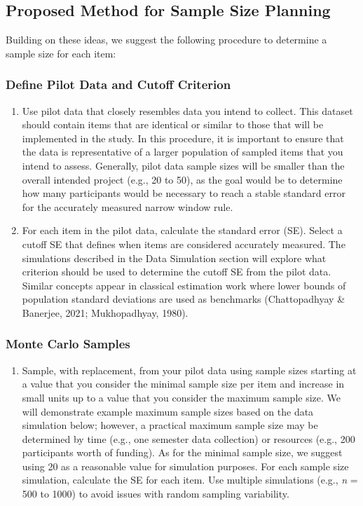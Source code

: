 \documentclass[
  man]{apa7}
\providecommand{\tightlist}{%
  \setlength{\itemsep}{0pt}\setlength{\parskip}{0pt}}
\begin{document}
\subsection{Proposed Method for Sample Size Planning}\label{proposed-method-for-sample-size-planning}

Building on these ideas, we suggest the following procedure to determine a sample size for each item:

\subsubsection{Define Pilot Data and Cutoff Criterion}\label{define-pilot-data-and-cutoff-criterion}

\begin{enumerate}
\def\labelenumi{\arabic{enumi})}
\item
  Use pilot data that closely resembles data you intend to collect. This dataset should contain items that are identical or similar to those that will be implemented in the study. In this procedure, it is important to ensure that the data is representative of a larger population of sampled items that you intend to assess. Generally, pilot data sample sizes will be smaller than the overall intended project (e.g., 20 to 50), as the goal would be to determine how many participants would be necessary to reach a stable standard error for the accurately measured narrow window rule.
\item
  For each item in the pilot data, calculate the standard error (SE). Select a cutoff SE that defines when items are considered accurately measured. The simulations described in the Data Simulation section will explore what criterion should be used to determine the cutoff SE from the pilot data. Similar concepts appear in classical estimation work where lower bounds of population standard deviations are used as benchmarks (Chattopadhyay \& Banerjee, 2021; Mukhopadhyay, 1980).
\end{enumerate}

\subsubsection{Monte Carlo Samples}\label{monte-carlo-samples}

\begin{enumerate}
\def\labelenumi{\arabic{enumi})}
\setcounter{enumi}{2}
\tightlist
\item
  Sample, with replacement, from your pilot data using sample sizes starting at a value that you consider the minimal sample size per item and increase in small units up to a value that you consider the maximum sample size. We will demonstrate example maximum sample sizes based on the data simulation below; however, a practical maximum sample size may be determined by time (e.g., one semester data collection) or resources (e.g., 200 participants worth of funding). As for the minimal sample size, we suggest using 20 as a reasonable value for simulation purposes. For each sample size simulation, calculate the SE for each item. Use multiple simulations (e.g., \emph{n} = 500 to 1000) to avoid issues with random sampling variability.
\end{enumerate}
\end{document}
